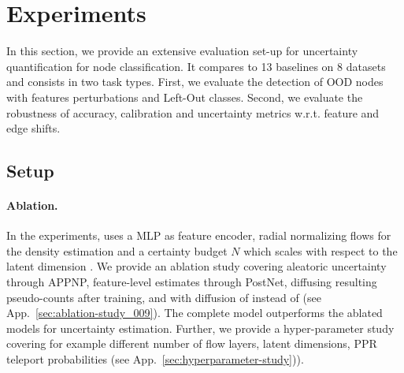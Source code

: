 \section{Experiments} 
\label{sec:experiments_009}

In this section, we provide an extensive evaluation set-up for uncertainty quantification for node classification. It compares \textbf{\GPNacro{}} to 13 baselines on 8 datasets and consists in two task types. First, we evaluate the detection of OOD nodes with features perturbations and Left-Out classes. Second, we evaluate the robustness of accuracy, calibration and uncertainty metrics w.r.t. feature and edge shifts.

\subsection{Setup}

\paragraph{Ablation.} In the experiments, \GPNacro{} uses a MLP as feature encoder, radial normalizing flows \citep{radialflow} for the density estimation and a certainty budget $N$ which scales with respect to the latent dimension \citep{NatPN2021}. We provide an ablation study covering aleatoric uncertainty through APPNP, feature-level estimates through PostNet, diffusing resulting pseudo-counts after training, and \GPNacro{} with diffusion of  instead of  (see App.~\ref{sec:ablation-study_009}). The complete \GPNacro{} model outperforms the ablated models for uncertainty estimation. Further, we provide a hyper-parameter study covering for example different number of flow layers, latent dimensions, PPR teleport probabilities (see App.~\ref{sec:hyperparameter-study})). 

